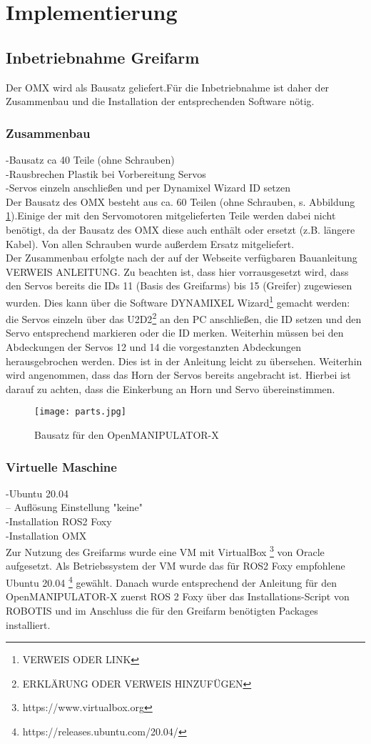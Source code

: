 \section{Implementierung}

\subsection {Inbetriebnahme Greifarm}
Der OMX wird als Bausatz geliefert.Für die Inbetriebnahme ist daher der Zusammenbau und die Installation der entsprechenden Software  nötig. 
\subsubsection{Zusammenbau}
-Bausatz ca 40 Teile (ohne Schrauben)\\
-Rausbrechen Plastik bei Vorbereitung Servos\\
-Servos einzeln anschließen und per Dynamixel Wizard ID setzen\\
Der Bausatz des OMX besteht aus ca. 60 Teilen (ohne Schrauben, s. Abbildung \ref{fig:omxparts}).Einige der mit den Servomotoren mitgelieferten Teile werden dabei nicht benötigt, da der Bausatz des OMX diese auch enthält oder ersetzt (z.B. längere Kabel). Von allen Schrauben wurde außerdem Ersatz mitgeliefert.\\
Der Zusammenbau erfolgte nach der auf der Webseite verfügbaren Bauanleitung VERWEIS ANLEITUNG. Zu beachten ist, dass hier vorrausgesetzt wird, dass den Servos bereits die IDs 11 (Basis des Greifarms) bis 15 (Greifer) zugewiesen wurden. Dies kann über die Software DYNAMIXEL Wizard{\footnote{VERWEIS ODER LINK}} gemacht werden: die Servos einzeln über das U2D2{\footnote{ERKLÄRUNG ODER VERWEIS HINZUFÜGEN}} an den PC anschließen, die ID setzen und den Servo entsprechend markieren oder die ID merken. Weiterhin müssen bei den Abdeckungen der Servos 12 und 14 die vorgestanzten Abdeckungen herausgebrochen werden. Dies ist in der Anleitung leicht zu übersehen. Weiterhin wird angenommen, dass das Horn der Servos bereits angebracht ist. Hierbei ist darauf zu achten, dass die Einkerbung an Horn und Servo übereinstimmen.
\begin{figure}[ht!]
\centering
\texttt{[image: parts.jpg]}
\caption{Bausatz für den OpenMANIPULATOR-X}
\label{fig:omxparts}
\end{figure}
\subsubsection{Virtuelle Maschine}
-Ubuntu 20.04\\
-- Auflösung Einstellung "keine"\\
-Installation ROS2 Foxy\\
-Installation OMX\\
Zur Nutzung des Greifarms wurde eine \ac{VM} mit VirtualBox {\footnote{https://www.virtualbox.org}} von Oracle aufgesetzt. Als Betriebssystem der \ac{VM} wurde das für ROS2 Foxy empfohlene \citet{foxyreq} Ubuntu 20.04 {\footnote{https://releases.ubuntu.com/20.04/}} gewählt. Danach wurde entsprechend der Anleitung für den OpenMANIPULATOR-X \citet{foxyinstall} zuerst ROS 2 Foxy über das Installations-Script von ROBOTIS und im Anschluss die für den Greifarm benötigten Packages installiert.
